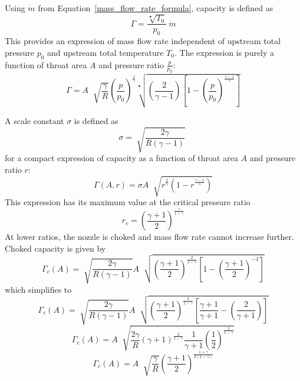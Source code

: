 \documentclass[a4paper, 11pt, oneside]{report}
\begin{document}
Using $\dot{m}$ from Equation~\ref{mass_flow_rate_formula}, capacity is defined as
\begin{equation}\label{capacity_definition}
\Gamma = \frac{\sqrt[•]{T_0}}{p_0}  \>
\dot{m}
\end{equation}
This provides an expression of mass flow rate independent of upstream total pressure $p_0$ and upstream total temperature $T_0$. The expression is purely a function of throat area $A$ and pressure ratio $\frac{p}{p_0}$:
\begin{equation}
\Gamma =
A \;
\sqrt[]{\frac{\gamma}{R}}
\left(
    \frac{p}{p_0}
\right)^\frac{1}{\gamma}
\sqrt[•]{
	\left(
		\frac{2}{\gamma - 1}  
	\right)
	\left[
		1 - \left( \frac{p}{p_0} \right)^\frac{\gamma-1}{\gamma}
	\right] 
}
\end{equation}

A scale constant $\sigma$ is defined as
\begin{equation}
\sigma = 
\sqrt[]{\frac{2\gamma}{R\left(\gamma-1\right)}} \;
\end{equation}
for a compact expression of capacity as a function of throat area $A$ and pressure ratio $r$:
\begin{equation}
\Gamma \left( A, r \right) = 
\sigma
A \;
\sqrt[]{
	r^\frac{2}{\gamma}
	\left(
		1 - r ^\frac{\gamma-1}{\gamma}
	\right) 
}
\end{equation}
This expression has its maximum value at the critical pressure ratio
\begin{equation}
r_c =
\left(
	\frac{\gamma+1}{2}
\right)
^\frac{\gamma}{1-\gamma}
\end{equation}
At lower ratios, the nozzle is choked and mass flow rate cannot increase further. Choked capacity is given by
\begin{equation}
\Gamma_c \left( A \right) =
\sqrt[]{\frac{2\gamma}{R\left(\gamma-1\right)}}
A \;
\sqrt[]{
	\left(
		\frac{\gamma+1}{2}  
	\right)
	^\frac{2}{1-\gamma}
	\left[
		1 - 
		\left(
			\frac{\gamma+1}{2}
		\right)
		^{-1}
	\right]
}
\end{equation}
which simplifies to
\begin{equation}
\Gamma_c \left( A \right) =
\sqrt[]{\frac{2\gamma}{R\left(\gamma-1\right)}}
A \;
\sqrt[]{
	\left(
		\frac{\gamma+1}{2}  
	\right)
	^\frac{2}{1-\gamma}
	\left[
		\frac{\gamma+1}{\gamma+1}
		-
		\left(
			\frac{2}{\gamma+1}
		\right)
	\right]
}
\end{equation}
\begin{equation}
\Gamma_c \left( A \right) =
A \;
\sqrt[]{
	\frac{2\gamma}{R}
	\left(
		\gamma+1
	\right)
	^\frac{2}{1-\gamma}
	\frac{1}{\gamma+1}
	\left(
		\frac{1}{2}
	\right)
	^\frac{2}{1-\gamma}
}
\end{equation}
\begin{equation}\label{choked_capacity_from_area}
\Gamma_c \left( A \right) =
A \;
\sqrt[]{
	\frac{\gamma}{R}
}
\left(
	\frac{\gamma+1}{2}
\right)
^\frac{1+\gamma}{2\left(1-\gamma\right)}
\end{equation}
\end{document}
